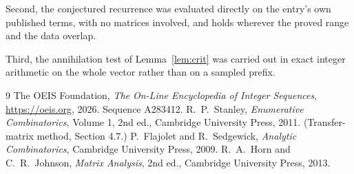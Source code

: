 \documentclass[11pt,a4paper]{article}
\theoremstyle{plain}
\theoremstyle{definition}
\begin{document}
Second, the conjectured recurrence was evaluated directly on the entry's own published terms,
with no matrices involved, and holds wherever the proved range and the data overlap.

Third, the annihilation test of Lemma~\ref{lem:crit} was carried out in exact integer
arithmetic on the whole vector rather than on a sampled prefix.

\begin{thebibliography}{9}
 The OEIS Foundation, \emph{The On-Line Encyclopedia of Integer
Sequences}, \url{https://oeis.org}, 2026. Sequence A283412.
 R.~P.~Stanley, \emph{Enumerative Combinatorics}, Volume 1, 2nd ed.,
Cambridge University Press, 2011. (Transfer-matrix method, Section 4.7.)
 P.~Flajolet and R.~Sedgewick, \emph{Analytic Combinatorics}, Cambridge
University Press, 2009.
 R.~A.~Horn and C.~R.~Johnson, \emph{Matrix Analysis}, 2nd ed., Cambridge
University Press, 2013.
\end{thebibliography}
\end{document}
